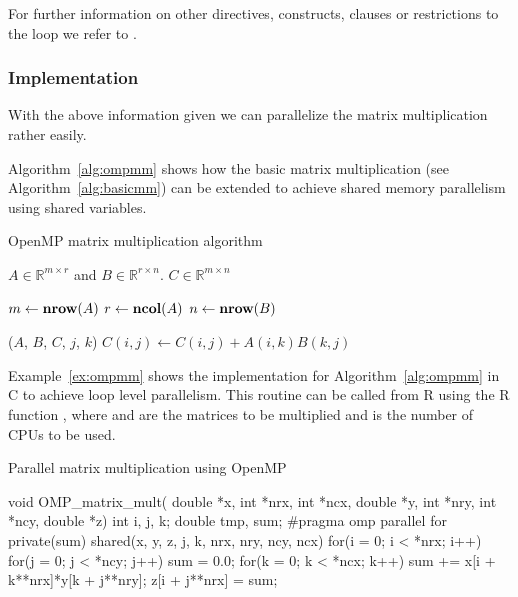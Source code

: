 For further information on other directives, constructs, clauses or
restrictions to the  loop we refer to \cite{openMP05}.

\subsubsection{Implementation}

With the above information given we can parallelize the matrix
multiplication rather easily.

Algorithm~\ref{alg:ompmm} shows how the basic matrix multiplication
(see Algorithm~\ref{alg:basicmm}) can be extended to achieve shared
memory parallelism using shared variables. 

\begin{algorithm}
\caption{OpenMP matrix multiplication algorithm}
\label{alg:ompmm}
\begin{algorithmic}[1]

  \REQUIRE $A \in \mathbb{R}^{m \times r}$ and $B \in \mathbb{R}^{r
    \times n}$.
  \ENSURE $C \in \mathbb{R}^{m \times n}$

  \STATE $m \leftarrow \textbf{nrow} (A)$
  \STATE $r \leftarrow \textbf{ncol} (A)$
  \STATE $n \leftarrow \textbf{nrow} (B)$

  \STATE \OMPFOR \OMPSHARE($A$, $B$, $C$, $j$, $k$)
         \STATE $C(i,j) \leftarrow C(i,j) + A(i,k)B(k,j)$
       \ENDFOR
    \ENDFOR
  \ENDFOR

\end{algorithmic}
\end{algorithm}

Example~\ref{ex:ompmm} shows the implementation for
Algorithm~\ref{alg:ompmm} in C to achieve loop level parallelism. This
routine can be called from R
using the R function , where  and
 are the matrices to be multiplied and  is the
number of CPUs to be used.
\begin{Example} Parallel matrix multiplication using OpenMP
\label{ex:ompmm}
\begin{Scode}

void OMP_matrix_mult( double *x, int *nrx, int *ncx,
		      double *y, int *nry, int *ncy,
		      double *z) {
  int i, j, k;
  double tmp, sum;
  #pragma omp parallel for private(sum) shared(x, y, z, j, k, nrx,
                                             nry, ncy, ncx)
  for(i = 0; i < *nrx; i++)
    for(j = 0; j < *ncy; j++){
      sum = 0.0;
      for(k = 0; k < *ncx; k++) 
	sum += x[i + k**nrx]*y[k + j**nry];
      z[i + j**nrx] = sum;
    }
}
\end{Scode}
\end{Example}

